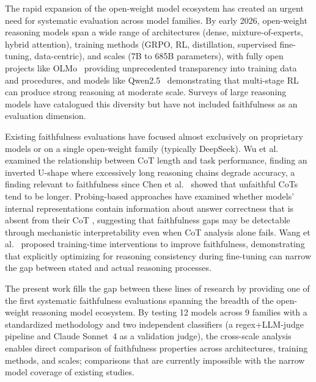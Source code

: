 The rapid expansion of the open-weight model ecosystem has created an urgent need
for systematic evaluation across model families. By early 2026, open-weight
reasoning models span a wide range of architectures (dense, mixture-of-experts,
hybrid attention), training methods (GRPO, RL, distillation, supervised
fine-tuning, data-centric), and scales (7B to 685B parameters), with fully
open projects like OLMo~\cite{groeneveld2024olmo} providing unprecedented
transparency into training data and procedures, and models like
Qwen2.5~\cite{qwen2024technical} demonstrating that multi-stage RL can produce
strong reasoning at moderate scale. Surveys of large reasoning models
\cite{xu2025large, qchen2025longcot, li2025system12} have catalogued this
diversity but have not included faithfulness as an evaluation dimension.

Existing faithfulness evaluations have focused almost exclusively on proprietary
models or on a single open-weight family (typically DeepSeek). Wu et
al.~\cite{wu2025moreless} examined the relationship between CoT length and task
performance, finding an inverted U-shape where excessively long reasoning chains
degrade accuracy, a finding relevant to faithfulness since Chen et
al.~\cite{chen2025reasoning} showed that unfaithful CoTs tend to be longer.
Probing-based approaches have examined whether models' internal representations
contain information about answer correctness that is absent from their CoT
\cite{liu2025probing}, suggesting that faithfulness gaps may be detectable through
mechanistic interpretability even when CoT analysis alone fails. Wang et
al.~\cite{wang2024making} proposed training-time interventions to improve
faithfulness, demonstrating that explicitly optimizing for reasoning consistency
during fine-tuning can narrow the gap between stated and actual reasoning processes.

The present work fills the gap between these lines of research by providing one of the first systematic faithfulness evaluations spanning the breadth of the
open-weight reasoning model ecosystem. By testing 12 models across 9 families
with a standardized methodology and two independent classifiers (a
regex+LLM-judge pipeline and Claude Sonnet~4 as a validation judge), the
cross-scale analysis enables direct comparison of faithfulness properties
across architectures, training methods, and scales; comparisons that are
currently impossible with the narrow model coverage of existing studies.
